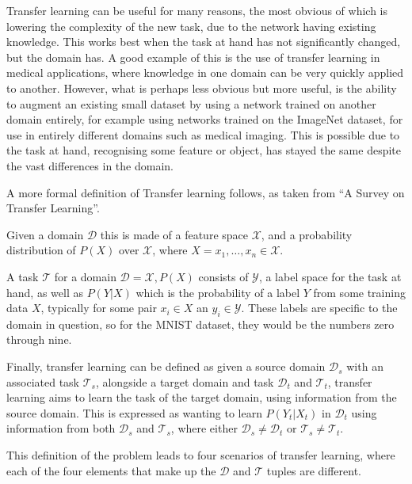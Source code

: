 Transfer learning can be useful for many reasons, the most obvious of which is
lowering the complexity of the new task, due to the network having existing
knowledge. This works best when the task at hand has not significantly changed,
but the domain has. A good example of this is the use of transfer learning in
medical applications, where knowledge in one domain can be very quickly applied
to another\cite{van2015transfer}. However, what is perhaps less obvious but more
useful, is the ability to augment an existing small dataset by using a network
trained on another domain entirely, for example using networks trained on the
ImageNet dataset\cite{ILSVRC15}, for use in entirely different domains such as
medical imaging\cite{shin2016deep, tajbakhsh2016convolutional}. This is possible
due to the task at hand, recognising some feature or object, has stayed the same
despite the vast differences in the domain.

A more formal definition of Transfer learning follows, as taken from ``A
Survey on Transfer Learning''\cite{pan2010survey}.

Given a domain $\mathcal{D}$ this is made of a feature space $\mathcal{X}$, and a
probability distribution of $P(X)$ over $\mathcal{X}$, where $X = x_1, \ldots,
x_n \in \mathcal{X}$.

A task $\mathcal{T}$ for a domain $\mathcal{D} = {\mathcal{X}, P(X)}$ consists
of $\mathcal{Y}$, a label space for the task at hand, as well as $P(Y|X)$ which
is the probability of a label $Y$ from some training data $X$, typically for
some pair $x_i \in X$ an $y_i \in \mathcal{Y}$. These labels are specific to the
domain in question, so for the MNIST dataset, they would be the numbers zero
through nine.

Finally, transfer learning can be defined as given a source domain
$\mathcal{D}_s$ with an associated task $\mathcal{T}_s$, alongside a target
domain and task $\mathcal{D}_t$ and $\mathcal{T}_t$, transfer learning aims to
learn the task of the target domain, using information from the source domain.
This is expressed as wanting to learn $P(Y_t | X_t)$ in $\mathcal{D}_t$ using
information from both $\mathcal{D}_s$ and $\mathcal{T}_s$, where either
$\mathcal{D}_s \ne \mathcal{D}_t$ or $\mathcal{T}_s \ne \mathcal{T}_t$.

This definition of the problem leads to four scenarios of transfer learning,
where each of the four elements that make up the $\mathcal{D}$ and $\mathcal{T}$
tuples are different.


